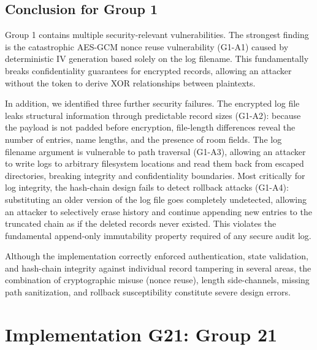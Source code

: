 \documentclass[a4paper, 12pt]{article}
\begin{document}
    \subsection{Conclusion for Group 1}
    Group 1 contains multiple security-relevant vulnerabilities. The strongest finding is the catastrophic AES-GCM nonce reuse vulnerability (G1-A1) caused by deterministic IV generation based solely on the log filename. This fundamentally breaks confidentiality guarantees for encrypted records, allowing an attacker without the token to derive XOR relationships between plaintexts.

    In addition, we identified three further security failures. The encrypted log file leaks structural information through predictable record sizes (G1-A2): because the payload is not padded before encryption, file-length differences reveal the number of entries, name lengths, and the presence of room fields. The log filename argument is vulnerable to path traversal (G1-A3), allowing an attacker to write logs to arbitrary filesystem locations and read them back from escaped directories, breaking integrity and confidentiality boundaries. Most critically for log integrity, the hash-chain design fails to detect rollback attacks (G1-A4): substituting an older version of the log file goes completely undetected, allowing an attacker to selectively erase history and continue appending new entries to the truncated chain as if the deleted records never existed. This violates the fundamental append-only immutability property required of any secure audit log.

    Although the implementation correctly enforced authentication, state validation, and hash-chain integrity against individual record tampering in several areas, the combination of cryptographic misuse (nonce reuse), length side-channels, missing path sanitization, and rollback susceptibility constitute severe design errors.

    \section{Implementation G21: Group 21}
\end{document}
